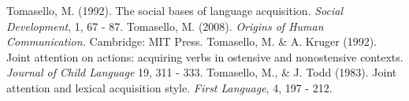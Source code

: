 \documentclass[12pt]{article}
\begin{document}
\begin{thebibliography}{99}
Tomasello, M. (1992). The social bases of language acquisition. \emph{Social Development}, 1, 67 - 87.
Tomasello, M. (2008). \emph{Origins of Human Communication.} Cambridge: MIT Press.
Tomasello, M. \& A. Kruger (1992). Joint attention on actions: acquiring verbs in ostensive and nonostensive contexts. \emph{Journal of Child Language} 19, 311 - 333.
Tomasello, M., \& J. Todd (1983). Joint attention and lexical acquisition style. \emph{First Language}, 4, 197 - 212.
\end{thebibliography}
\end{document}
